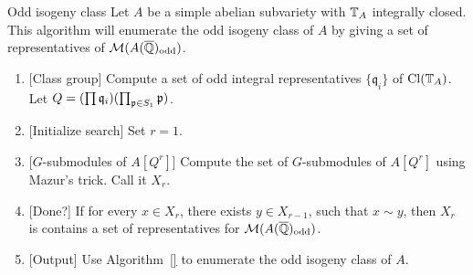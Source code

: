 \documentclass{article}
\renewcommand{\q}{\mathfrak{q}}
\newcommand{\odd}{\mathrm{odd}}
\begin{document}
\begin{algorithm}{Odd isogeny class}
    Let $A$ be a simple abelian subvariety with $\mathbb{T}_A$ integrally closed. This
    algorithm will enumerate the odd isogeny class of $A$ by giving a set of
    representatives of $\M(A(\QQbar)_\odd)$.
    \begin{enumerate}
        \item{} [Class group]
            Compute a set of odd integral representatives $\{\q_i\}$ of
            $\operatorname{Cl}(\mathbb{T}_A)$. Let $Q = (\prod \q_i)(\prod_{\p\in S_1} \p)$. 
        \item{} [Initialize search]
            Set $r=1$.
        \item{} [$G$-submodules of $A[Q^r]$]
            Compute the set of $G$-submodules of $A[Q^r]$ using Mazur's trick.
            Call it $X_r$.
        \item{} [Done?]
            If for every $x\in X_r$, there exists $y\in X_{r-1}$, such that
            $x\sim y$, then $X_r$ is contains a set of representatives for
            $\M(A(\QQbar)_\odd)$.
        \item{} [Output]
            Use Algorithm~\ref{} to enumerate the odd isogeny class of $A$. 
    \end{enumerate}
\end{algorithm}


\end{document}
